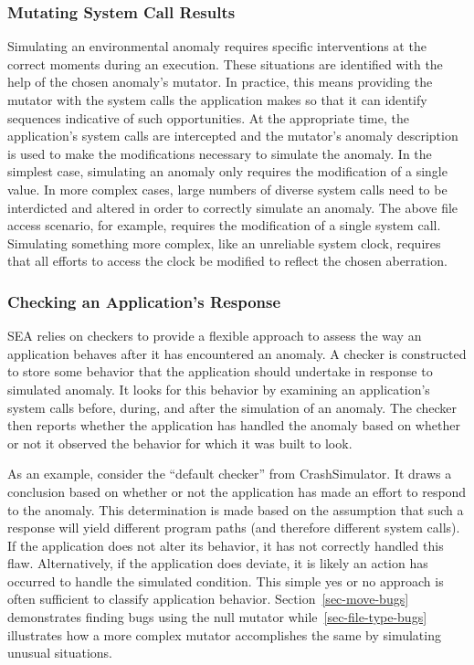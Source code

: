 \subsubsection{Mutating System Call Results}
\label{SUBSUB:MutatingCommunications}
Simulating an environmental anomaly requires specific interventions at the
correct moments during an execution.
These situations are identified
with the help of the chosen anomaly's
mutator.
In practice,
this means providing the
mutator with the system calls
the application makes
so that it can identify sequences
indicative of such opportunities.
At the appropriate time,
the application's system calls
are intercepted
and the mutator's anomaly description is used to
make the modifications necessary
to simulate the anomaly.
In the simplest case,
simulating an anomaly only requires
the modification of a single value.
In more complex cases,
large numbers of diverse system calls
need to be interdicted and altered
in order to correctly simulate an anomaly.
The above file access scenario, for example,
requires the modification of a single system call.
Simulating something more complex,
like an unreliable system clock,
requires that all efforts
to access the clock
be modified to reflect the chosen aberration.

\subsubsection{Checking an Application's Response}
\label{SUBSUB:CheckingResponse}
SEA relies on checkers
to provide a flexible approach to assess the way an application
behaves after it has encountered an anomaly.
A checker is constructed to store
some behavior that the application should undertake
in response to simulated anomaly.
It looks for this behavior by examining an application's system calls
before, during, and after the simulation of an anomaly.
The checker then reports whether the application has handled
the anomaly based on whether or not it observed the behavior for which it
was built to look.

As an example, consider the ``default checker'' from CrashSimulator.
It draws a conclusion based on
whether or not the application
has made an effort to respond
to the anomaly.
This determination is made based
on the assumption
that such a response will yield
different program paths (and therefore different system calls).
If the application
does not alter its behavior, it has not
correctly handled this flaw.
Alternatively,
if the application does deviate,
it is likely
an action has occurred to handle the simulated condition.
This simple yes or no approach
is often sufficient
to classify application behavior.
Section~\ref{sec-move-bugs} demonstrates finding bugs using the null
mutator while~\ref{sec-file-type-bugs} illustrates how a more complex
mutator accomplishes the same by simulating unusual situations.



